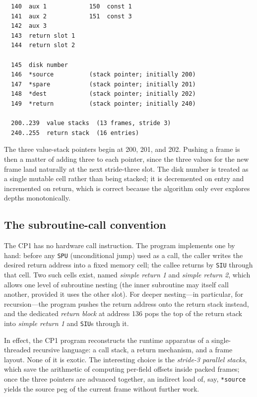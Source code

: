 \documentclass[11pt,a4paper]{article}
\begin{document}
\begin{lstlisting}
  140  aux 1            150  const 1
  141  aux 2            151  const 3
  142  aux 3
  143  return slot 1
  144  return slot 2

  145  disk number
  146  *source          (stack pointer; initially 200)
  147  *spare           (stack pointer; initially 201)
  148  *dest            (stack pointer; initially 202)
  149  *return          (stack pointer; initially 240)

  200..239  value stacks  (13 frames, stride 3)
  240..255  return stack  (16 entries)
\end{lstlisting}

\noindent
The three value-stack pointers begin at 200, 201, and 202. Pushing a
frame is then a matter of adding three to each pointer, since the
three values for the new frame land naturally at the next stride-three
slot. The disk number is treated as a single mutable cell rather than
being stacked; it is decremented on entry and incremented on return,
which is correct because the algorithm only ever explores depths
monotonically.

\subsection{The subroutine-call convention}

The CP1 has no hardware call instruction. The program implements one
by hand: before any \texttt{SPU} (unconditional jump) used as a call,
the caller writes the desired return address into a fixed memory cell;
the callee returns by \texttt{SIU} through that cell. Two such cells
exist, named \emph{simple return 1} and \emph{simple return 2}, which
allows one level of subroutine nesting (the inner subroutine may
itself call another, provided it uses the other slot). For deeper
nesting---in particular, for recursion---the program pushes the return
address onto the return stack instead, and the dedicated
\textit{return block} at address 136 pops the top of the return stack
into \emph{simple return 1} and \texttt{SIU}s through it.

In effect, the CP1 program reconstructs the runtime apparatus
of a single-threaded recursive language: a call stack, a return
mechanism, and a frame layout. None of it is exotic. The interesting
choice is the \emph{stride-3 parallel stacks}, which save the
arithmetic of computing per-field offsets inside packed frames; once
the three pointers are advanced together, an indirect load of, say,
\texttt{*source} yields the source peg of the current frame without
further work.
\end{document}
